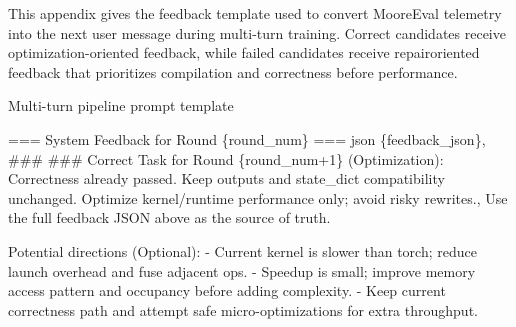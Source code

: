 \documentclass[
  10
]{article}
\newenvironment{Shaded}{}{}
\newcommand{\NormalTok}[1]{#1}
\begin{document}
This appendix gives the feedback template used to convert MooreEval
telemetry into the next user message during multi-turn training. Correct
candidates receive optimization-oriented feedback, while failed
candidates receive repairoriented feedback that prioritizes compilation
and correctness before performance.

\begin{Shaded}
\begin{Highlighting}[]
\NormalTok{Multi{-}turn pipeline prompt template}

\NormalTok{=== System Feedback for Round \{round\_num\} ===}
\NormalTok{\textasciigrave{}\textasciigrave{}\textasciigrave{}json}
\NormalTok{\{feedback\_json\},}
\NormalTok{\#\#\#}
\NormalTok{\#\#\# Correct}
\NormalTok{Task for Round \{round\_num+1\} (Optimization):}
\NormalTok{Correctness already passed. Keep outputs and state\_dict compatibility unchanged.}
\NormalTok{Optimize kernel/runtime performance only; avoid risky rewrites.\textquotesingle{}, }
\NormalTok{Use the full feedback JSON above as the source of truth.}

\NormalTok{Potential directions (Optional):}
\NormalTok{{-} Current kernel is slower than torch; reduce launch overhead and fuse adjacent ops.}
\NormalTok{{-} Speedup is small; improve memory access pattern and occupancy before adding complexity.}
\NormalTok{{-} Keep current correctness path and attempt safe micro{-}optimizations for extra throughput. }
\end{Highlighting}
\end{Shaded}
\end{document}
